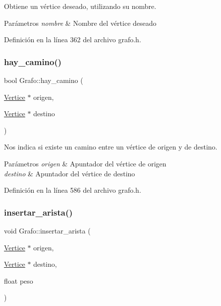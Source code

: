 Obtiene un vértice deseado, utilizando su nombre. 


\begin{DoxyParams}{Parámetros}
{\em nombre} & Nombre del vértice deseado \\
\hline
\end{DoxyParams}


Definición en la línea 362 del archivo grafo.\+h.

\mbox{\label{classGrafo_a24cc1dad8b719978e5fcba8b0950c3f5}} 
\subsubsection{\texorpdfstring{hay\+\_\+camino()}{hay\_camino()}}
{\footnotesize\ttfamily bool Grafo\+::hay\+\_\+camino (\begin{DoxyParamCaption}\item[{\hyperlink{classVertice}{Vertice} $\ast$}]{origen,  }\item[{\hyperlink{classVertice}{Vertice} $\ast$}]{destino }\end{DoxyParamCaption})}



Nos indica si existe un camino entre un vértice de origen y de destino. 


\begin{DoxyParams}{Parámetros}
{\em origen} & Apuntador del vértice de origen \\
\hline
{\em destino} & Apuntador del vértice de destino \\
\hline
\end{DoxyParams}


Definición en la línea 586 del archivo grafo.\+h.

\mbox{\label{classGrafo_ae49d7c6c60a6b5bb1a7e66ef72144d36}} 
\subsubsection{\texorpdfstring{insertar\+\_\+arista()}{insertar\_arista()}}
{\footnotesize\ttfamily void Grafo\+::insertar\+\_\+arista (\begin{DoxyParamCaption}\item[{\hyperlink{classVertice}{Vertice} $\ast$}]{origen,  }\item[{\hyperlink{classVertice}{Vertice} $\ast$}]{destino,  }\item[{float}]{peso }\end{DoxyParamCaption})}



